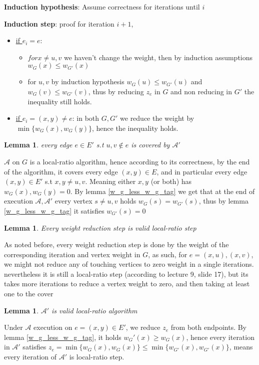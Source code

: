 \documentclass[11pt]{article}
\newtheorem{lemma}[theorem]{Lemma}
\begin{document}
\textbf{Induction hypothesis}: Assume correctness for iterations until $i$

\textbf{Induction step}: proof for iteration $i+1$,
\begin{itemize}
    \item \underline{if $e_i = e$}:
        \begin{itemize}
            \item $for x \ne u,v$ we haven't change the weight, then by induction assumptions $w_G(x) \le w_{G'}(x)$
            \item for $u,v$ by induction hypothesis $w_G(u) \le w_{G'}(u)$ and $w_G(v) \le w_{G'}(v)$, thus by reducing $z_e$ in $G$ and non reducing in $G'$ the inequality still holds.
        \end{itemize}
    \item \underline{if $e_i=(x,y) \ne e$}: in both $G,G'$ we reduce the weight by  $\min\{w_G(x),w_G(y)\}$, hence the inequality holds.
\end{itemize}


\begin{lemma}
\label{lemma_2}
every edge $e\in E'$ s.t $u,v \notin e$ is covered by $\mathcal{A'}$
\end{lemma}
$\mathcal{A}$ on $G$ is a local-ratio algorithm, hence according to its correctness, by the end of the algorithm, it covers every edge $(x,y) \in E$, and in particular every edge $(x,y) \in E'$ s.t $x,y \ne u,v$. Meaning either $x,y$ (or both) has $w_G(x), w_G(y)=0$. By lemma \ref{w_g_less_w_g_tag} we get that at the end of execution $\mathcal{A}, \mathcal{A'}$ every vertex $s \ne u,v$ holds $w_G(s)=w_{G'}(s)$, thus by lemma \ref{w_g_less_w_g_tag} it satisfies $w_{G'}(s) = 0$ 

\begin{lemma}
\label{lemma_3}
Every weight reduction step is valid local-ratio step
\end{lemma}
As noted before, every weight reduction step is done by the weight of the corresponding iteration and vertex weight in $G$, as such, for $e=(x,u), (x,v)$, we might not reduce any of touching vertices to zero weight in a single iterations. nevertheless it is still a local-ratio step (according to lecture 9, slide 17), but its takes more iterations to reduce a vertex weight to zero, and then taking at least one to the cover

\begin{lemma}
\label{A_TAG_AS_WHILE_LOCAL_RATIO}
$\mathcal{A'}$ is valid local-ratio algorithm
\end{lemma}
Under $\mathcal{A}$ execution on $e=(x,y) \in E'$, we reduce $z_e$ from both endpoints. By lemma \ref{w_g_less_w_g_tag}, it holds $w_G'(x) \ge w_G(x)$, hence every iteration in $\mathcal{A'}$ satisfies $z_e = \min\{w_G(x), w_G(x)\} \le \min\{w_{G'}(x), w_{G'}(x)\}$, means every iteration of $\mathcal{A'}$ is local-ratio step.
\end{document}
